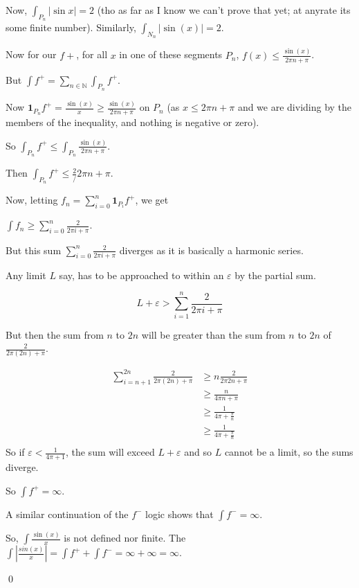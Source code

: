 \documentclass[11pt,oneside]{article}
\numberwithin{equation}{section}
\theoremstyle{definition}
\def\NN{\mathbb{N}}
\def\one{\mathbf{1}}
\begin{document}
\begin{solution}
      
 Now, $\int _ {P_n} |\sin x| = 2$ (tho as far
 as I know we can't prove that yet; at anyrate its some finite
 number).  Similarly, $\int_ {N_n} | \sin(x) | = 2 $.

 Now for our $f+$, for all $x$ in one of these segments $P_n$, $f(x) \leq \frac{\sin(x)}{2 \pi n + \pi}$.

 But $\int f^+ = \sum \limits _ { n \in \NN} \int _ {P_n} f^+$.  

 Now $ \one _ {P_n} f^+ = \frac{\sin(x)}{x} \geq \frac{\sin(x)}{2 \pi n + \pi}$ on $P_n$ (as $x \leq 2\pi n + \pi$ and we
 are dividing by the members of the inequality, and nothing is negative or zero).  
 
 So $ \int _ {P_n} f^+ \leq \int _ {P_n} \frac{\sin(x)}{2 \pi n + \pi} $.

 Then $ \int _{P_n} f^+ \leq \frac{2}/{2\pi n + \pi} $.

 Now, letting $f_n = \sum \limits _ {i = 0} ^ {n} \one _ { P_i} f^+$, we get

 $ \int f_n \geq \sum \limits _ {i = 0} ^ {n} \frac{2}{2 \pi i + \pi}$.

 But this sum $\sum \limits _ {i = 0} ^ {n} \frac{2}{2 \pi i + \pi}$ diverges as it is basically
 a harmonic series.

 Any limit $L$ say, has to be approached to within an $\varepsilon$ by the partial sum.

 \[
 L + \varepsilon > \sum \limits _ {i = 1} ^ {n} \frac{2}{2 \pi i + \pi}
 \]

 But then the sum from $n$ to $2n$ will be greater than the sum from $n$ to $2n$ of $\frac{2}{2 \pi (2n) + \pi}$.

 \begin{align*}
   \sum _{i=n+1}^{2n} \frac{2}{2 \pi (2n) + \pi} & \geq n \frac{2}{2\pi 2n + \pi} \\
   & \geq \frac{n}{4 \pi n + \pi} \\
   & \geq \frac{1}{4 \pi +  \frac{\pi}{n}} \\
   & \geq \frac{1}{4 \pi +  \frac{\pi}{n}} \\
 \end{align*}
 So if $\varepsilon < \frac{1}{4\pi + 1}$, the sum will exceed $L + \varepsilon$ and so $L$ cannot be a limit, so the sums diverge.

 So $\int f^+ = \infty$.

 A similar continuation of the $f^-$ logic shows that $\int f^- = \infty$.

 So, $\int \frac{\sin(x)}{x}$ is not defined nor finite.  The $\int \left| \frac{sin(x)}{x} \right| = \int f^+ + \int f^- = \infty + \infty = \infty$.

   \qed
  
\end{solution}
\end{document}
